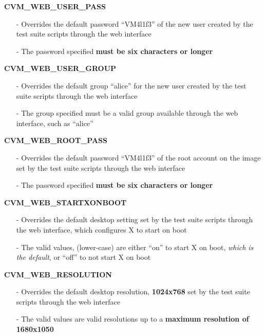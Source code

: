 \begin{description}
\item {\bf CVM\_WEB\_USER\_PASS}
		\begin{itemize}
		\item[-]	Overrides the default password ``VM4l1f3'' of the new user created 
				by the test suite scripts through the web interface
		\item[-]	The password specified {\bf must be six characters or longer}
		\end{itemize}

\item {\bf CVM\_WEB\_USER\_GROUP}
		\begin{itemize}
		\item[-]	Overrides the default group ``alice'' for the new user created 
				by the test suite scripts through the web interface
		\item[-]	The group specified must be a valid group available
				through the web interface, such as ``alice''
		\end{itemize}

\item {\bf CVM\_WEB\_ROOT\_PASS}
		\begin{itemize}
		\item[-]	Overrides the default password ``VM4l1f3'' of the root account
				on the \cernvm image set by the test suite scripts through the
				web interface
		\item[-]	The password specified {\bf must be six characters or longer}
		\end{itemize}
		
\item {\bf CVM\_WEB\_STARTXONBOOT}
		\begin{itemize}
		\item[-]	Overrides the default \cernvm desktop setting set by the test 
				suite scripts through the web interface, which configures X to
				start on boot
		\item[-]	The valid values, (lower-case) are either ``on'' to start X on boot,
				\emph{which is the default}, or ``off'' to not start X on boot		
		\end{itemize}
				
\item {\bf CVM\_WEB\_RESOLUTION}
		\begin{itemize}
		\item[-]	Overrides the default \cernvm desktop resolution, {\bf 1024x768} set by
				the test suite scripts through the web interface
		\item[-]	The valid values are valid resolutions up to a {\bf maximum resolution
				of 1680x1050}
		\end{itemize}


\end{description}
